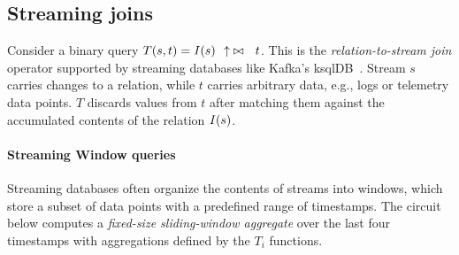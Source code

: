\subsection{Streaming joins}

Consider a binary query $T(s, t) = \mathit{I}(s)~~{\uparrow}\bowtie~~t$.  This is the
\emph{relation-to-stream join} operator supported by streaming databases like Kafka's ksqlDB~\cite{jafarpour-edbt19}.
Stream $s$ carries changes to a relation, while $t$ carries arbitrary data, e.g., logs
or telemetry data points. $T$ discards values from $t$ after matching them against the accumulated contents of the relation $\mathit{I}(s)$.


\paragraph{Streaming Window queries}

Streaming databases often organize the contents of streams into windows, 
which store a subset of data points with a predefined range of timestamps.
The circuit below computes a \emph{fixed-size sliding-window aggregate}
over the last four timestamps with aggregations defined by the $T_i$ functions.

\begin{center}
\end{center}

